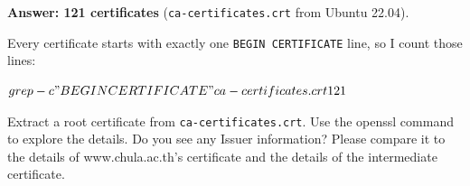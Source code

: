 \documentclass[a4paper, 10pt]{article}
\begin{document}
\begin{solution}
	\noindent \textbf{Answer: 121 certificates} (\texttt{ca-certificates.crt} from Ubuntu 22.04).

	\myspace
	
	Every certificate starts with exactly one \texttt{BEGIN CERTIFICATE} line, so I count those lines:

	\myspace

\begin{codingbox*}[numbers=none, xleftmargin=0pt, belowskip=6pt, basicstyle=\ttfamily\footnotesize\color{editortext}]
$ grep -c "BEGIN CERTIFICATE" ca-certificates.crt
121
$
\end{codingbox*}
\end{solution}

\begin{problem}
	Extract a root certificate from \texttt{ca-certificates.crt}.
	Use the openssl command to explore the details.
	Do you see any Issuer information?
	Please compare it to the details of www.chula.ac.th's certificate and the details of the intermediate certificate.
\end{problem}
\end{document}
